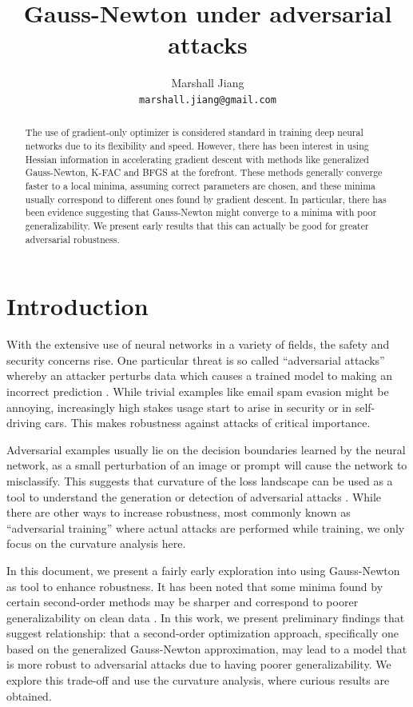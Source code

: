 \documentclass{article}
\title{Gauss-Newton under adversarial attacks}
\author{%
    Marshall Jiang \\
    \texttt{marshall.jiang@gmail.com} \\
}
\begin{document}
    \maketitle


    \begin{abstract}
        The use of gradient-only optimizer is considered standard in training deep neural networks due to its flexibility and speed.
        However, there has been interest in using Hessian information in accelerating gradient descent with methods like
        generalized Gauss-Newton, K-FAC and BFGS at the forefront.
        These methods generally converge faster to a local minima, assuming correct parameters are chosen, and these minima usually correspond to different ones found by gradient descent.
        In particular, there has been evidence suggesting that Gauss-Newton might converge to a minima with poor generalizability.
        We present early results that this can actually be good for greater adversarial robustness.
    \end{abstract}


    \section{Introduction}
    With the extensive use of neural networks in a variety of fields, the safety and security concerns rise.
    One particular threat is so called ``adversarial attacks'' whereby an attacker perturbs data which causes a trained model to making an incorrect prediction \citep{chakraborty2018adversarial}.
    While trivial examples like email spam evasion might be annoying, increasingly high stakes usage start to arise in security or in self-driving cars.
    This makes robustness against attacks of critical importance.

    Adversarial examples usually lie on the decision boundaries learned by the neural network, as a small perturbation of an image or prompt will cause the network to misclassify.
    This suggests that curvature of the loss landscape can be used as a tool to understand the generation or detection of adversarial attacks \citep{zheng2023detecting,liu2022flooding}.
    While there are other ways to increase robustness, most commonly known as ``adversarial training'' where actual attacks are performed while training, we only focus on the curvature analysis here.

    In this document, we present a fairly early exploration into using Gauss-Newton as tool to enhance robustness.
    It has been noted that some minima found by certain second-order methods may be sharper and correspond to poorer generalizability on clean data \citep{buffelli2024exact,amari2020does}.
    In this work, we present preliminary findings that suggest relationship: that a second-order optimization approach, specifically one based on the generalized Gauss-Newton approximation, may lead to a model that is more robust to adversarial attacks due to having poorer generalizability.
    We explore this trade-off and use the curvature analysis, where curious results are obtained.
\end{document}

